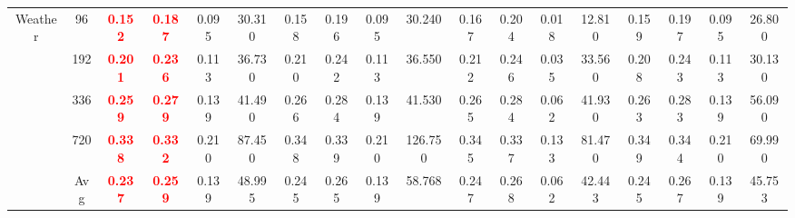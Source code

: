\documentclass[final,3p,times]{elsarticle}
\newcommand{\best}[1]{\textbf{\textcolor{red}{#1}}}
\begin{document}
\begin{table}[!t]
{\begin{tabular}{c|c|cccc|cccc|cccc|cccc}
\multirow{5}{*}{Weather} 
& 96  & \best{0.152} & \best{0.187} & 0.095 & 30.310 & 0.158 & 0.196 & 0.095 & 30.240 & 0.167 & 0.204 & 0.018 & 12.810 & 0.159 & 0.197 & 0.095 & 26.800 \\
& 192 & \best{0.201} & \best{0.236} & 0.113 & 36.730 & 0.210 & 0.242 & 0.113 & 36.550 & 0.212 & 0.246 & 0.035 & 33.560 & 0.208 & 0.243 & 0.113 & 30.130 \\
& 336 & \best{0.259} & \best{0.279} & 0.139 & 41.490 & 0.266 & 0.284 & 0.139 & 41.530 & 0.265 & 0.284 & 0.062 & 41.930 & 0.263 & 0.283 & 0.139 & 56.090 \\
& 720 & \best{0.338} & \best{0.332} & 0.210 & 87.450 & 0.348 & 0.339 & 0.210 & 126.750 & 0.345 & 0.337 & 0.133 & 81.470 & 0.349 & 0.344 & 0.210 & 69.990 \\
& Avg & \best{0.237} & \best{0.259} & 0.139 & 48.995 & 0.245 & 0.265 & 0.139 & 58.768 & 0.247 & 0.268 & 0.062 & 42.443 & 0.245 & 0.267 & 0.139 & 45.753 \\
\bottomrule
\end{tabular}
}
\label{tab:abl_pdt} 
\end{table}
\end{document}
